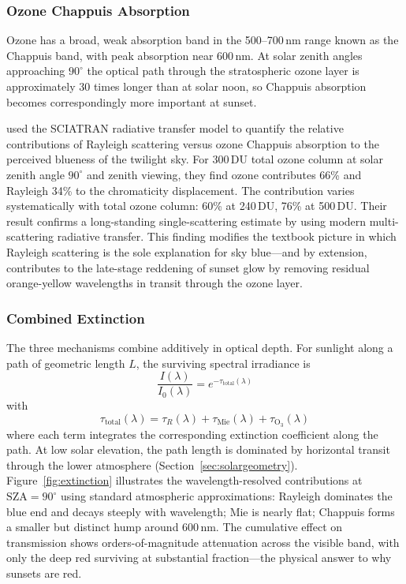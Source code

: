 \documentclass[11pt,a4paper]{article}
\newcommand{\SZA}{\text{SZA}}
\newcommand{\tauR}{\tau_R}
\newcommand{\tauM}{\tau_{\text{Mie}}}
\newcommand{\tauO}{\tau_{\mathrm{O_3}}}
\newcommand{\tautotal}{\tau_{\text{total}}}
\begin{document}
\subsubsection{Ozone Chappuis Absorption}

Ozone has a broad, weak absorption band in the 500--700\,nm range known as the Chappuis band, with peak absorption near 600\,nm. At solar zenith angles approaching $90^\circ$ the optical path through the stratospheric ozone layer is approximately 30 times longer than at solar noon, so Chappuis absorption becomes correspondingly more important at sunset.

\citet{lange2023revisiting} used the SCIATRAN radiative transfer model to quantify the relative contributions of Rayleigh scattering versus ozone Chappuis absorption to the perceived blueness of the twilight sky. For 300\,DU total ozone column at solar zenith angle $90^\circ$ and zenith viewing, they find ozone contributes 66\% and Rayleigh 34\% to the chromaticity displacement. The contribution varies systematically with total ozone column: 60\% at 240\,DU, 76\% at 500\,DU. Their result confirms a long-standing single-scattering estimate by \citet{hulburt1953explanation} using modern multi-scattering radiative transfer. This finding modifies the textbook picture in which Rayleigh scattering is the sole explanation for sky blue---and by extension, contributes to the late-stage reddening of sunset glow by removing residual orange-yellow wavelengths in transit through the ozone layer.

\subsubsection{Combined Extinction}

The three mechanisms combine additively in optical depth. For sunlight along a path of geometric length $L$, the surviving spectral irradiance is
\begin{equation}
\frac{I(\lambda)}{I_0(\lambda)} = e^{-\tautotal(\lambda)}
\label{eq:beer}
\end{equation}
with
\begin{equation}
\tautotal(\lambda) = \tauR(\lambda) + \tauM(\lambda) + \tauO(\lambda)
\label{eq:tausum}
\end{equation}
where each term integrates the corresponding extinction coefficient along the path. At low solar elevation, the path length is dominated by horizontal transit through the lower atmosphere (Section~\ref{sec:solargeometry}). Figure~\ref{fig:extinction} illustrates the wavelength-resolved contributions at $\SZA = 90^\circ$ using standard atmospheric approximations: Rayleigh dominates the blue end and decays steeply with wavelength; Mie is nearly flat; Chappuis forms a smaller but distinct hump around 600\,nm. The cumulative effect on transmission shows orders-of-magnitude attenuation across the visible band, with only the deep red surviving at substantial fraction---the physical answer to why sunsets are red.
\end{document}
